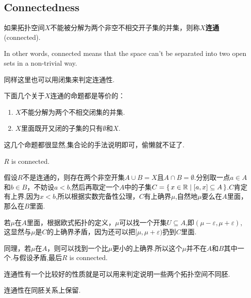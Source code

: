 \newpage
\subsection{Connectedness}

\begin{definition}
如果拓扑空间$X$不能被分解为两个非空不相交开子集的并集，则称$X$\textbf{连通}(connected).

\rm In other words, connected means that the space can’t be separated into two open sets in a non-trivial way.
\end{definition}

同样这里也可以用闭集来判定连通性.

\begin{proposition}
下面几个关于$X$连通的命题都是等价的：
\begin{enumerate}
	\item $X$不能分解为两个不相交闭集的并集.
	\item $X$里面既开又闭的子集的只有$\emptyset$和$X$.
\end{enumerate}
\end{proposition}

这几个命题都很显然,集合论的手法说明即可，偷懒就不证了.

\begin{example}
\rm $R$ is connected.

假设$R$不是连通的，则存在两个非空开集$A \cup B = X$且$A \cap B = \emptyset$.分别取一点$a \in A$和$b \in B$，不妨设$a < b$,然后再取定一个$A$中的子集$C=\{\,x \in \mathbb{R}\mid[a,x] \subseteq A\,\}$.$C$肯定有上界,因为$x < b$,所以根据实数完备性公理，$C$有上确界$\mu$,自然地$\mu$要么在$A$里面，那么在$B$里面.

若$\mu$在$A$里面，根据欧式拓扑的定义，$\mu$可以找一个开集$U \subseteq A$,即$(\mu-\varepsilon,\mu+\varepsilon)$,这显然与$\mu$是$C$的上确界矛盾，因为还可以把$[\mu,\mu+\varepsilon)$扔到$C$里面.

同理，若$\mu$在$A$，则可以找到一个比$\mu$更小的上确界.所以这个$\mu$并不在$A$和$B$其中一个.与假设矛盾,最后$R$ is connected.
\end{example}

连通性有一个比较好的性质就是可以用来判定说明一些两个拓扑空间不同胚.

\begin{proposition}
连通性在同胚关系上保留.
\end{proposition}

